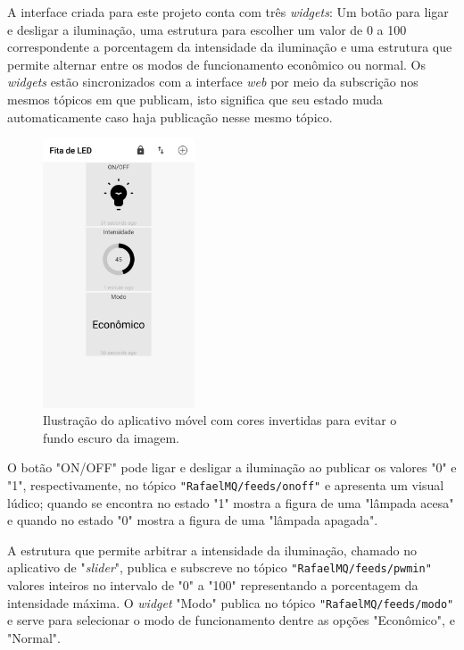 A interface criada para este projeto conta com três \textit{widgets}: Um botão para ligar e desligar a iluminação, uma estrutura para escolher um valor de 0 a 100 correspondente a porcentagem da intensidade da iluminação e uma estrutura que permite alternar entre os modos de funcionamento econômico ou normal. Os \textit{widgets} estão sincronizados com a interface \textit{web} por meio da subscrição nos mesmos tópicos em que publicam, isto significa que seu estado muda automaticamente caso haja publicação nesse mesmo tópico.

\begin{figure}[ht]
    \begin{center}
    \includegraphics[width=0.4\textwidth]{figuras/appdash.png}
    \end{center}
    \caption[Ilustração do aplicativo móvel.]{Ilustração do aplicativo móvel com cores invertidas para evitar o fundo escuro da imagem.}
    \label{appdash}
\end{figure}

O botão "ON/OFF" pode ligar e desligar a iluminação ao publicar os valores "0" e "1", respectivamente, no tópico \texttt{"RafaelMQ/feeds/onoff"} e apresenta um visual lúdico; quando se encontra no estado "1" mostra a figura de uma "lâmpada acesa" e quando no estado "0" mostra a figura de uma "lâmpada apagada". 

A estrutura que permite arbitrar a intensidade da iluminação, chamado no aplicativo de "\textit{slider}", publica e subscreve no tópico \texttt{"RafaelMQ/feeds/pwmin"} valores inteiros no intervalo de "0" a "100" representando a porcentagem da intensidade máxima. O \textit{widget} "Modo" publica no tópico \texttt{"RafaelMQ/feeds/modo"} e serve para selecionar o modo de funcionamento dentre as opções "Econômico", e "Normal". 

